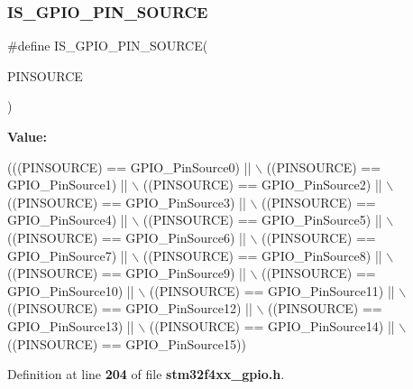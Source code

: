 \mbox{\label{group__GPIO__Pin__sources_ga689e4e72591136b6a8d4df9d895181f7}} 
\subsubsection{I\+S\+\_\+\+G\+P\+I\+O\+\_\+\+P\+I\+N\+\_\+\+S\+O\+U\+R\+CE}
{\footnotesize\ttfamily \#define I\+S\+\_\+\+G\+P\+I\+O\+\_\+\+P\+I\+N\+\_\+\+S\+O\+U\+R\+CE(\begin{DoxyParamCaption}\item[{}]{P\+I\+N\+S\+O\+U\+R\+CE }\end{DoxyParamCaption})}

{\bfseries Value\+:}
\begin{DoxyCode}
(((PINSOURCE) == GPIO_PinSource0) || \(\backslash\)
                                       ((PINSOURCE) == GPIO_PinSource1) || \(\backslash\)
                                       ((PINSOURCE) == GPIO_PinSource2) || \(\backslash\)
                                       ((PINSOURCE) == GPIO_PinSource3) || \(\backslash\)
                                       ((PINSOURCE) == GPIO_PinSource4) || \(\backslash\)
                                       ((PINSOURCE) == GPIO_PinSource5) || \(\backslash\)
                                       ((PINSOURCE) == GPIO_PinSource6) || \(\backslash\)
                                       ((PINSOURCE) == GPIO_PinSource7) || \(\backslash\)
                                       ((PINSOURCE) == GPIO_PinSource8) || \(\backslash\)
                                       ((PINSOURCE) == GPIO_PinSource9) || \(\backslash\)
                                       ((PINSOURCE) == GPIO_PinSource10) || \(\backslash\)
                                       ((PINSOURCE) == GPIO_PinSource11) || \(\backslash\)
                                       ((PINSOURCE) == GPIO_PinSource12) || \(\backslash\)
                                       ((PINSOURCE) == GPIO_PinSource13) || \(\backslash\)
                                       ((PINSOURCE) == GPIO_PinSource14) || \(\backslash\)
                                       ((PINSOURCE) == GPIO_PinSource15))
\end{DoxyCode}


Definition at line \textbf{ 204} of file \textbf{ stm32f4xx\+\_\+gpio.\+h}.

